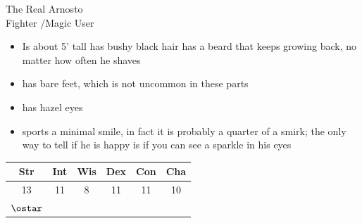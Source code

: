 \documentclass[11pt]{article}
\begin{document}
\begin{minipage}{0.55\textwidth}%
    \Huge{\Fontauri The Real Arnosto} \\
    \Large{Fighter \FighterLevel/Magic User \MagicUserLevel} \\
    \begin{normalsize}
        \begin{itemize}[topsep=0pt, itemsep=0pt, partopsep=0pt, parsep=0pt, leftmargin=*]
            \item Is about 5’ tall has bushy black hair has a beard that keeps growing back, no matter how often he shaves
            \item has bare feet, which is not uncommon in these parts
            \item has hazel eyes
            \item sports a minimal smile, in fact it is probably a quarter of a smirk; the only way to tell if he is happy is if you can see a sparkle in his eyes
        \end{itemize}
    \end{normalsize}
    \begin{large}
        \vspace{0.4cm}
        \begin{tabular}{cccccc}
            Str & Int & Wis & Dex & Con & Cha \\ \hline
            13 & 11 & 8 & 11 & 11 & 10\\ 
            $\ostar$ & & & & & 
        \end{tabular}
    \end{large}
    \vspace{0.4cm}


\end{minipage}
\end{document}
